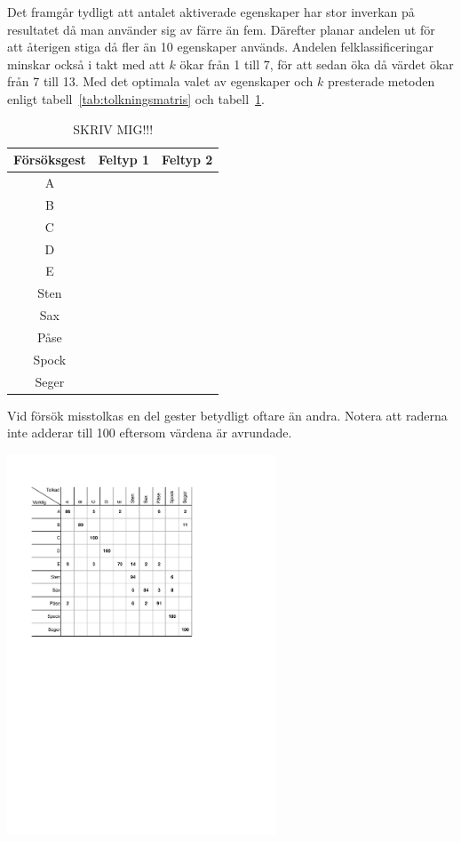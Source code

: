 \documentclass[../rapport_MVEX01-11-05]{subfiles}
\begin{document}
Det framgår tydligt att antalet aktiverade egenskaper har stor
inverkan på resultatet då man använder sig av färre än
fem. Därefter planar andelen ut för att återigen stiga då
fler än 10 egenskaper används. Andelen felklassificeringar
minskar också i takt med att $k$ ökar från 1 till 7, för att sedan
öka då värdet ökar från 7 till 13. Med det optimala
valet av egenskaper och $k$ presterade metoden enligt
tabell~\ref{tab:tolkningsmatris} och tabell~\ref{tab:prestanda}.


\begin{table}[tbp]
	\centering
	\label{tab:prestanda}
	\caption{SKRIV MIG!!!}
	\begin{tabular}{c c c}
		\toprule 
		Försöksgest & Feltyp 1 & Feltyp 2 \\
		\midrule 
		A & & \\
		B & & \\
		C & & \\
		D & & \\
		E & & \\
		Sten & & \\
		Sax & & \\
		Påse & & \\
		Spock & & \\
		Seger & & \\
		\bottomrule 
	\end{tabular}
\end{table}

\begin{table}[tbp]
	  \centering
		\label{tab:tolkningsmatris}
		\caption{Vid försök misstolkas en del gester betydligt oftare än
		andra. Notera att raderna inte adderar till 100 eftersom värdena är
		avrundade.}
    \includegraphics[trim=2cm 15cm 6cm 2.5cm,clip=true,width=8cm]{bilder/tolkningsmatris.pdf}
\end{table}
\end{document}

